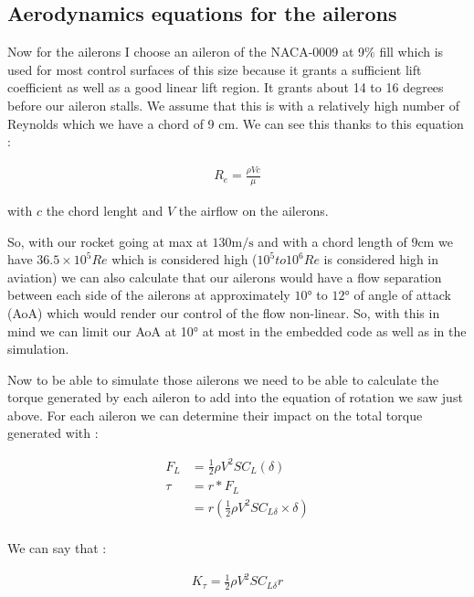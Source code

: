 \subsection{Aerodynamics equations for the ailerons}

Now for the ailerons I choose an aileron of the NACA-0009 at 9\% fill which is
used for most control surfaces of this size because it grants a sufficient lift
coefficient as well as a good linear lift region. It grants about 14 to 16
degrees before our aileron stalls. We assume that this is with a relatively
high number of Reynolds which we have a chord of 9 cm. We can see this thanks
to this equation :

\begin{gather*}
    R_e = \frac{\rho V c}{\mu}
\end{gather*}

with $c$ the chord lenght and $V$ the airflow on the ailerons.

So, with our rocket going at max at $130 \si{\meter\per\second}$ and with a
chord length of $9 \si{\centi\meter}$ we have $36.5 \times 10^5 Re$ which is
considered high ($10^5 to 10^6 Re$ is considered high in aviation) we can also
calculate that our ailerons would have a flow separation between each side of
the ailerons at approximately $10 \si{\degree}$ to $12 \si{\degree}$ of angle
of attack (AoA) which would render our control of the flow non-linear. So, with
this in mind we can limit our AoA at 10° at most in the embedded code as well
as in the simulation.

Now to be able to simulate those ailerons we need to be able to calculate the
torque generated by each aileron to add into the equation of rotation we saw
just above. For each aileron we can determine their impact on the total torque
generated with :

\begin{align*}
    F_L  & = \frac{1}{2} \rho V^2 S C_L (\delta)                    \\
    \tau & = r * F_L                                                \\
         & = r ( \frac{1}{2} \rho V^2 S C_{L \delta} \times \delta) \\
\end{align*}

We can say that :

\begin{gather*}
    K_\tau = \frac{1}{2} \rho V^2 S C_{L \delta} r
\end{gather*}

